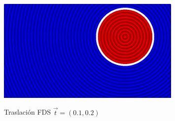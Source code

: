 \begin{figure}[H]
  \centering
  \captionsetup{justification=centering}%
  \includegraphics[width=0.8\textwidth]{secciones/imagenes/sdf/2d/sdf_traslacion.png}\label{fig:traslacion}
  \caption{Traslación FDS \(\Vec{t}=(0.1, 0.2)\)}
\end{figure}


